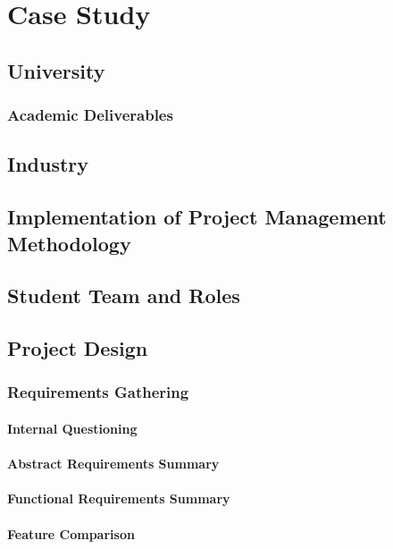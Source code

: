 \chapter{Case Study}

\section{University}
\subsection{Academic Deliverables}

\section{Industry}

\section{Implementation of Project Management Methodology}

\section{Student Team and Roles}

\section{Project Design}
\subsection{Requirements Gathering}
\subsubsection{Internal Questioning}
\subsubsection{Abstract Requirements Summary}
\subsubsection{Functional Requirements Summary}
\subsubsection{Feature Comparison}
